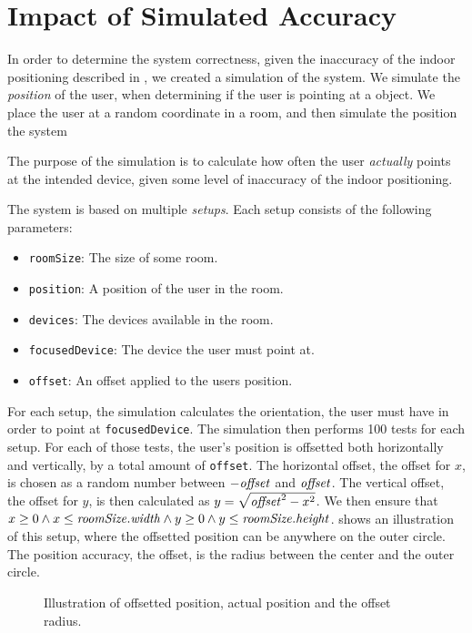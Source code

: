 \section{Impact of Simulated Accuracy}
\label{sec:evaluation:system-correctness}

In order to determine the system correctness, 
given the inaccuracy of the indoor positioning described in , 
we created a simulation of the system.
We simulate the \emph{position} of the user, when determining if the user is pointing at a object. 
We place the user at a random coordinate in a room, and then simulate the position the system 

The purpose of the simulation is to calculate how often the user \emph{actually} points at the intended device, 
given some level of inaccuracy of the indoor positioning.

The system is based on multiple \textit{setups}. 
Each setup consists of the following parameters:
\begin{itemize}
\item \texttt{roomSize}: The size of some room.
\item \texttt{position}: A position of the user in the room.
\item \texttt{devices}: The devices available in the room.
\item \texttt{focusedDevice}: The device the user must point at.
\item \texttt{offset}: An offset applied to the users position.
\end{itemize}

For each setup, the simulation calculates the orientation, 
the user must have in order to point at \texttt{focusedDevice}. 
The simulation then performs \num{100} tests for each setup. 
For each of those tests, 
the user's position is offsetted both horizontally and vertically, 
by a total amount of \texttt{offset}. 
The horizontal offset, \ie the offset for $x$, 
is chosen as a random number between $-\var{offset}$ and $\var{offset}$. 
The vertical offset, \ie the offset for $y$, 
is then calculated as $y = \sqrt{\var{offset}^2 - x^2}$. 
We then ensure that $x \geq 0 \wedge x \leq \var{roomSize.width} \wedge y \geq 0 \wedge y \leq \var{roomSize.height}$.
 shows an illustration of this setup,
where the offsetted position can be anywhere on the outer circle. 
The position accuracy, \ie the offset, is the radius between the center and the outer circle.

\begin{figure}[!htb]
  \centering
  
  \caption{Illustration of offsetted position, actual position and the offset radius.}
  \label{fig:offsetillustration}
\end{figure}


